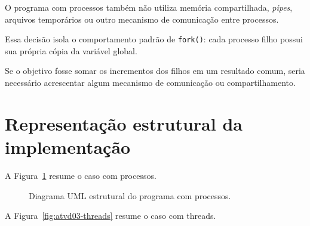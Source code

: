 O programa com processos também não utiliza memória compartilhada, \emph{pipes}, arquivos temporários ou outro mecanismo de comunicação entre processos.

Essa decisão isola o comportamento padrão de \texttt{fork()}: cada processo filho possui sua própria cópia da variável global.

Se o objetivo fosse somar os incrementos dos filhos em um resultado comum, seria necessário acrescentar algum mecanismo de comunicação ou compartilhamento.

\section{Representação estrutural da implementação}
\label{sec:atvd03-estrutura}

A Figura~\ref{fig:atvd03-processos} resume o caso com processos.

\begin{figure}[htbp]
    \centering
    \caption{Diagrama UML estrutural do programa com processos.}
    \label{fig:atvd03-processos}
\end{figure}

A Figura~\ref{fig:atvd03-threads} resume o caso com threads.

